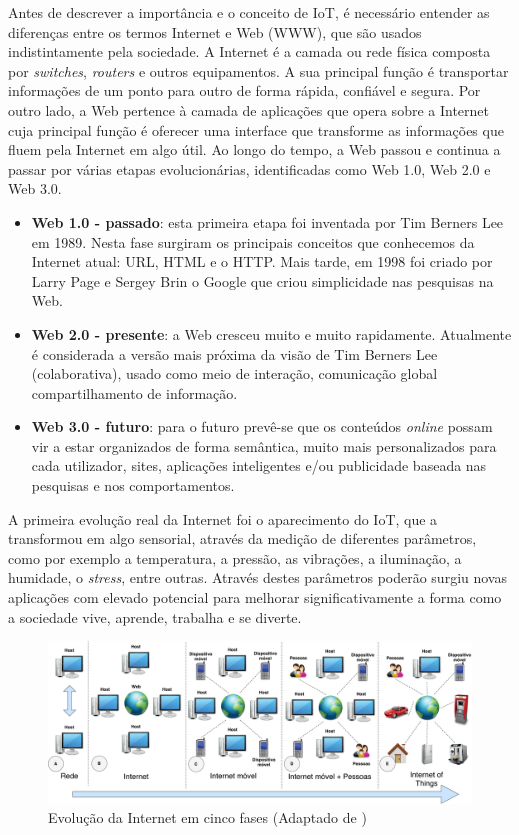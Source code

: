 Antes de descrever a importância e o conceito de \ac{IoT}, é necessário entender as diferenças entre os termos Internet e Web (\ac{WWW}), que são usados indistintamente pela sociedade. A Internet é a camada ou rede física composta por \textit{switches}, \textit{routers} e outros equipamentos\cite{Evans2011a}. A sua principal função é transportar informações de um ponto para outro de forma rápida, confiável e segura. Por outro lado, a Web pertence à camada de aplicações que opera sobre a Internet cuja principal função é oferecer uma interface que transforme as informações que fluem pela Internet em algo útil. Ao longo do tempo, a Web passou e continua a passar por várias etapas evolucionárias, identificadas como Web 1.0, Web 2.0 e Web 3.0. 

\begin{itemize}
	\item \textbf{Web 1.0 - passado}: esta primeira etapa foi inventada por Tim Berners Lee em 1989\cite{Getting}. Nesta fase surgiram os principais conceitos que conhecemos da Internet atual: \ac{URL}, \ac{HTML} e o \ac{HTTP}. Mais tarde, em 1998 foi criado por Larry Page e Sergey Brin o Google que criou simplicidade nas pesquisas na Web\cite{Lovato2014}. 
	
	\item \textbf{Web 2.0 - presente}: a Web cresceu muito e muito rapidamente. Atualmente é considerada a versão mais próxima da visão de Tim Berners Lee (colaborativa), usado como meio de interação, comunicação global compartilhamento de informação. 
	
	\item \textbf{Web 3.0 - futuro}: para o futuro prevê-se que os conteúdos \textit{online} possam vir a estar organizados de forma semântica, muito mais personalizados para cada utilizador, sites, aplicações inteligentes e/ou publicidade baseada nas pesquisas e nos comportamentos.
\end{itemize}

A  primeira evolução real da Internet foi o aparecimento do \ac{IoT}, que a transformou em algo sensorial, através da medição de diferentes parâmetros, como por exemplo a temperatura, a pressão, as vibrações, a iluminação, a humidade, o \textit{stress}, entre outras. Através destes parâmetros poderão surgiu novas aplicações com elevado potencial para melhorar significativamente a forma como a sociedade vive, aprende, trabalha e se diverte. 

\begin{figure}[h]
	\centering
	\includegraphics[width=\linewidth]{esquemas/iot-diagram.pdf}
	\caption[Evolução da Internet em cinco fases]{ Evolução da Internet em cinco fases (Adaptado de \cite{Our2013})}
	\label{iotEvolution}
\end{figure}


